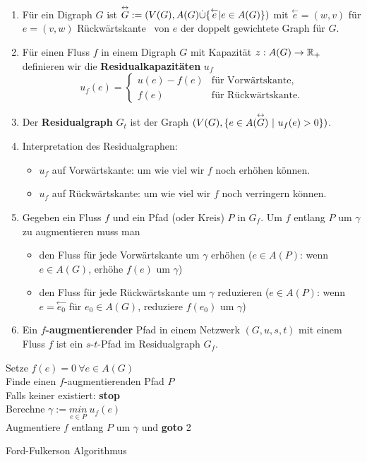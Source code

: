 \begin{definition}~
	\begin{enumerate}
		\item Für ein Digraph $G$ ist $\overset{\leftrightarrow}{G} := (V(G), A(G) \dot\cup \{\overset{\leftarrow}{e} \vert e \in A(G)\})$ mit $\overset{\leftarrow}{e} = (w,v)$ für $e=(v,w)$ \dq Rückwärtskante\dq~ von $e$ der doppelt gewichtete Graph für $G$.
		\item Für einen Fluss $f$ in einem Digraph $G$ mit Kapazität $z:A(G)\to \mathbb{R}_+$ definieren wir die \textbf{Residualkapazitäten} $u_f$ \[ u_f(e) = \begin{cases} u(e) - f(e) &\text{für Vorwärtskante,}\\ f(e) &\text{für Rückwärtskante.} \end{cases} \]
		\item Der \textbf{Residualgraph} $G_t$ ist der Graph $(V(G), \{e\in A(\overset{\leftrightarrow}{G})~\vert~ u_f(e) > 0\})$.
		\item Interpretation des Residualgraphen:
		\begin{itemize}
			\item $u_f$ auf Vorwärtskante: um wie viel wir $f$ noch erhöhen können.
			\item $u_f$ auf Rückwärtskante: um wie viel wir $f$ noch verringern können.
		\end{itemize}
	\item Gegeben ein Fluss $f$ und ein Pfad (oder Kreis) $P$ in $G_f$. Um $f$ entlang $P$ um $\gamma$ zu augmentieren muss man
	\begin{itemize}
		\item den Fluss für jede Vorwärtskante um $\gamma$ erhöhen ($e\in A(P)$: wenn $e \in A(G)$, erhöhe $f(e)$ um $\gamma$)
		\item den Fluss für jede Rückwärtskante um $\gamma$ reduzieren ($e \in A(P)$: wenn $e = \overset{\leftarrow}{e_0}$ für $e_0 \in A(G)$, reduziere $f(e_0)$ um $\gamma$)
	\end{itemize}
	\item Ein \textbf{$f$-augmentierender} Pfad in einem Netzwerk $(G, u, s, t)$ mit einem Fluss $f$ ist ein $s$-$t$-Pfad im Residualgraph $G_f$.
	\end{enumerate}
\end{definition}
\begin{algorithm}
	\vspace*{5pt}
	Setze $f(e)=0~\forall e\in A(G)$\\
	Finde einen $f$-augmentierenden Pfad $P$\\
	\hspace*{15pt}Falls keiner existiert: \textbf{stop} \\
	Berechne $\gamma := \underset{e\in P}{min}~ u_f(e)$\\
	\hspace*{15pt}Augmentiere $f$ entlang $P$ um $\gamma$ und \textbf{goto} 2
	\caption{Ford-Fulkerson Algorithmus}
	\label{fig:Algorithmus}
\end{algorithm}
